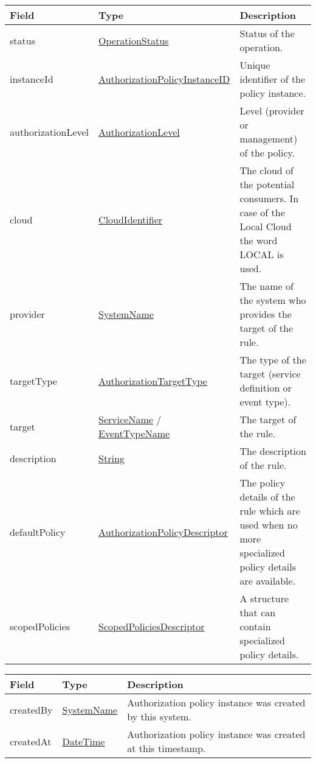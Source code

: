 \documentclass[a4paper]{arrowhead}
\newcommand{\pref}[1]{{\textcolor{ArrowheadGrey}{\hyperref[sec:model:primitives:#1]{#1}}}}
\begin{document}
\begin{table}[ht!]
\begin{tabularx}{\textwidth}{| p{4.25cm} | p{4.5cm} | X |} \hline
\rowcolor{gray!33} Field & Type      & Description \\ \hline
status & \pref{OperationStatus} & Status of the operation. \\ \hline
instanceId & \pref{AuthorizationPolicyInstanceID} & Unique identifier of the policy instance. \\ \hline
authorizationLevel & \pref{AuthorizationLevel} & Level (provider or management) of the policy. \\ \hline
cloud & \pref{CloudIdentifier} & The cloud of the potential consumers. In case of the Local Cloud the word LOCAL is used. \\ \hline
provider & \pref{SystemName} & The name of the system who provides the target of the rule. \\ \hline
targetType & \pref{AuthorizationTargetType} & The type of the target (service definition or event type). \\ \hline
target &  \pref{ServiceName} / \pref{EventTypeName} & The target of the rule. \\ \hline
description & \pref{String} & The description of the rule. \\ \hline
defaultPolicy & \hyperref[sec:model:AuthorizationPolicyDescriptor]{AuthorizationPolicyDescriptor} & The policy details of the rule which are used when no more specialized policy details are available. \\ \hline
scopedPolicies & \hyperref[sec:model:ScopedPoliciesDescriptor]{ScopedPoliciesDescriptor} & A structure that can contain specialized po\-licy details. \\ \hline
\end{tabularx}
\end{table}

\begin{table}[ht!]
\begin{tabularx}{\textwidth}{| p{4.25cm} | p{4.5cm} | X |} \hline
\rowcolor{gray!33} Field & Type      & Description \\ \hline
createdBy & \pref{SystemName} & Authorization policy instance was created by this system. \\ \hline
createdAt & \pref{DateTime} & Authorization policy instance was created at this timestamp. \\ \hline
\end{tabularx}
\end{table}
\end{document}
